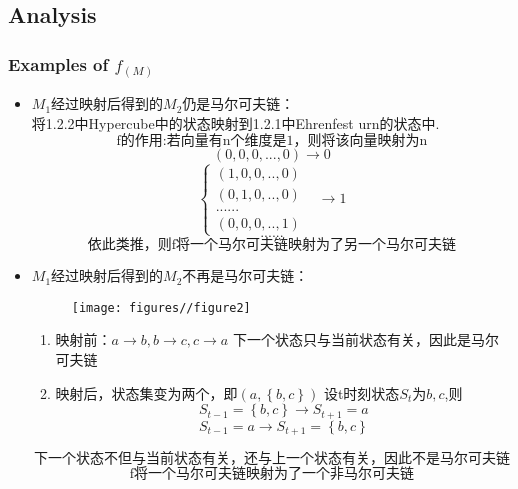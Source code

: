 \documentclass[a4paper, 11pt]{article} %
\begin{document}
\subsection{Analysis}
\begin{small}
\subsubsection{Examples of $f_{(M)}$}
\begin{itemize}
	\item $M_1$经过映射后得到的$M_2$仍是马尔可夫链：
	\\ 将1.2.2中Hypercube中的状态映射到1.2.1中Ehrenfest urn的状态中.
	$$\mbox{f的作用:若向量有n个维度是1，则将该向量映射为n}$$
	$$(0,0,0,...,0)\rightarrow0$$
	\begin{equation}  
           \left\{  
             \begin{array}{lr}  
              (1,0,0,..,0)&  \\  
             (0,1,0,..,0) &  \\ 
             ......& \\
             (0,0,0,..,1)
            \end{array}  
         \right.  
         \rightarrow 1
      \end{equation}
      $$\mbox{......}$$
       $$\mbox{依此类推，则f将一个马尔可夫链映射为了另一个马尔可夫链}$$

	\item $M_1$经过映射后得到的$M_2$不再是马尔可夫链：
	\begin{figure}[h]
    	\centering
    	\texttt{[image: figures//figure2]}
    \end{figure}
    \begin{enumerate}
    	\item 映射前：$a\rightarrow b,b\rightarrow c,c\rightarrow a$
    	下一个状态只与当前状态有关，因此是马尔可夫链
    	\item 映射后，状态集变为两个，即$(a,\left\{b,c\right\})$
    	设t时刻状态$S_t$为${b,c}$,则
    	$$
    	 S_{t-1}=\left\{b,c\right\}\rightarrow S_{t+1}=a
    	$$
    	$$
         S_{t-1}=a\rightarrow S_{t+1}=\left\{b,c\right\}
    	$$

    \end{enumerate}
    $$\mbox{下一个状态不但与当前状态有关，还与上一个状态有关，因此不是马尔可夫链}$$
    $$\mbox{f将一个马尔可夫链映射为了一个非马尔可夫链}$$
\end{itemize}

\end{small}
\end{document}
